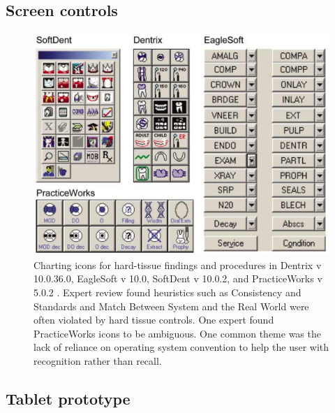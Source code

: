 \documentclass[11pt]{article}
\begin{document}
\newpage

\subsection{Screen controls}
\label{controls}
\begin{figure}[h]
\begin{center}
\includegraphics[width=\textwidth]{controls.png}
\end{center}
\caption{Charting icons for hard-tissue findings and procedures in Dentrix v 10.0.36.0, EagleSoft v 10.0, SoftDent v 10.0.2, and PracticeWorks v 5.0.2 \cite{Thyvalikakath2007Heuristic-evalu}. Expert review found heuristics such as Consistency and Standards and Match Between System and the Real World were often violated by hard tissue controls. One expert found PracticeWorks icons to be ambiguous. One common theme was the lack of reliance on operating system convention to help the user with recognition rather than recall.}\end{figure}


\newpage
\subsection{Tablet prototype}
\label{Prototype}
\end{document}
